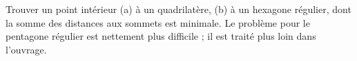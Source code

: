 Trouver un point intérieur (a) à un quadrilatère, (b) à un hexagone régulier, dont la somme des distances aux sommets est minimale. Le problème pour le pentagone régulier est nettement plus difficile ; il est traité plus loin dans l'ouvrage.
